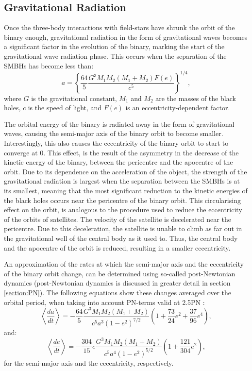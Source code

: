 \documentclass[english, twoside]{HYgradu}
\begin{document}
\subsection{Gravitational Radiation} \label{section:gravitational_radiation}

Once the three-body interactions with field-stars have shrunk the orbit of the binary enough, gravitational radiation in the form of gravitational waves becomes a significant factor in the evolution of the binary, marking the start of the gravitational wave radiation phase. This occurs when the separation of the SMBHs has become less than:
\begin{equation}
a = \left\lbrace \frac{64}{5} \frac{G^3M_1M_2(M_1+M_2)F(e)}{c^5} \right\rbrace^{1/4},
\end{equation}
where $G$ is the gravitational constant, $M_1$ and $M_2$ are the masses of the black holes, $c$ is the speed of light, and $F(e)$ is an eccentricity-dependent factor.

The orbital energy of the binary is radiated away in the form of gravitational waves, causing the semi-major axis of the binary orbit to become smaller. Interestingly, this also causes the eccentricity of the binary orbit to start to converge at $0$. This effect, is the result of the asymmetry in the decrease of the kinetic energy of the binary, between the pericentre and the apocentre of the orbit. Due to its dependence on the acceleration of the object, the strength of the gravitational radiation is largest when the separation between the SMBHs is at its smallest, meaning that the most significant reduction to the kinetic energies of the black holes occurs near the pericentre of the binary orbit. This circularising effect on the orbit, is analogous to the procedure used to reduce the eccentricity of the orbits of satellites. The velocity of the satellite is decelerated near the pericentre. Due to this deceleration, the satellite is unable to climb as far out in the gravitational well of the central body as it used to. Thus, the central body and the apocentre of the orbit is reduced, resulting in a smaller eccentricity.

An approximation of the rates at which the semi-major axis and the eccentricity of the binary orbit change, can be determined using so-called post-Newtonian dynamics (post-Newtonian dynamics is discussed in greater detail in section \ref{section:PN}). The following equations show these changes averaged over the orbital period, when taking into account PN-terms valid at 2.5PN \citep{Peters1964}:
\begin{equation}
\left\langle \frac{da}{dt} \right\rangle = -\frac{64}{5}\frac{G^3M_1M_2(M_1+M_2)}{c^5a^3(1-e^2)^{7/2}} \left( 1+\frac{73}{24}e^2+\frac{37}{96}e^4 \right), \label{eq:pn_dadt}
\end{equation}
and:
\begin{equation}
\left\langle \frac{de}{dt} \right\rangle = -\frac{304}{15}e\frac{G^3M_1M_2(M_1+M_2)}{c^5a^4(1-e^2)^{5/2}} \left( 1+\frac{121}{304}e^2 \right), \label{eq:pn_dedt}
\end{equation}
for the semi-major axis and the eccentricity, respectively. 
\end{document}
